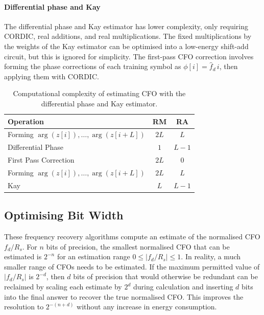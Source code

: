 \documentclass[12pt,a4paper]{report}
\begin{document}
\paragraph{Differential phase and Kay}
The differential phase and Kay estimator has lower complexity, only requiring CORDIC, real additions, and real multiplications. The fixed multiplications by the weights of the Kay estimator can be optimised into a low-energy shift-add circuit, but this is ignored for simplicity. The first-pass CFO correction involves forming the phase corrections of each training symbol as \(\phi[i] = \hat{f}_d\,i\), then applying them with CORDIC.
\begin{table}[H]
    \centering
    \begin{tabular}{lcc}
        \toprule
        Operation & RM & RA \\
        \midrule
        Forming \(\arg(z[i]), \dots, \arg(z[i+L])\) & \(2L\) & \(L\)\\
        Differential Phase & \(1\) & \(L-1\)\\
        First Pass Correction & \(2L\) & \(0\)\\
        Forming \(\arg(z[i]), \dots, \arg(z[i+L])\) & \(2L\) & \(L\) \\
        Kay & \(L\) & \(L-1\) \\
        \bottomrule
    \end{tabular}
    \caption{Computational complexity of estimating CFO with the differential phase and Kay estimator.}
    \label{tab:diffkay_cost}
\end{table}

\subsection{Optimising Bit Width}
These frequency recovery algorithms compute an estimate of the normalised CFO \(f_d / R_s\). For \(n\) bits of precision, the smallest normalised CFO that can be estimated is \(2^{-n}\) for an estimation range \(0 \leq |f_d / R_s| \leq 1\). In reality, a much smaller range of CFOs needs to be estimated. If the maximum permitted value of \(|f_d / R_s|\) is \(2^{-d}\), then \(d\) bits of precision that would otherwise be redundant can be reclaimed by scaling each estimate by \(2^d\) during calculation and inserting \(d\) bits into the final answer to recover the true normalised CFO. This improves the resolution to \(2^{-(n+d)}\) without any increase in energy consumption.
\end{document}
